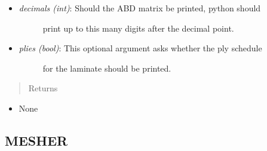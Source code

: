 \documentclass[letterpaper,10pt,english]{sphinxmanual}
\begin{document}
\begin{fulllineitems}
\begin{fulllineitems}
\begin{itemize}
\begin{description}
\end{description}

\item {} \begin{description}
\item[{\emph{decimals (int)}: Should the ABD matrix be printed, python should}] \leavevmode
print up to this many digits after the decimal point.

\end{description}

\item {} \begin{description}
\item[{\emph{plies (bool)}: This optional argument asks whether the ply schedule}] \leavevmode
for the laminate should be printed.

\end{description}

\end{itemize}
\begin{quote}\begin{description}
\item[{Returns}] \leavevmode
\end{description}\end{quote}
\begin{itemize}
\item {} 
None

\end{itemize}

\end{fulllineitems}


\end{fulllineitems}



\subsection{MESHER}
\label{structures:mesher}
\end{document}
